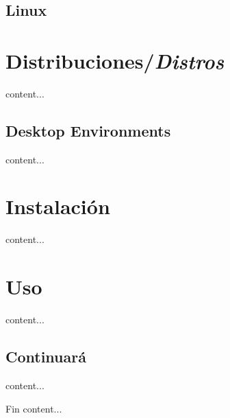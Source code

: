 \documentclass[12pt]{beamer}
\begin{document}
\subsection{Linux}
\begin{frame}
	
\end{frame}

\section{Distribuciones/\textit{Distros}}
\begin{frame}
	content...
\end{frame}

\subsection{Desktop Environments}
\begin{frame}
	content...
\end{frame}

\section{Instalación}
\begin{frame}
	content...
\end{frame}

\section{Uso}
\begin{frame}
	content...
\end{frame}

\subsection{Continuará}
\begin{frame}
	content...
\end{frame}

\begin{frame}{Fin}
	content...
\end{frame}
\end{document}
